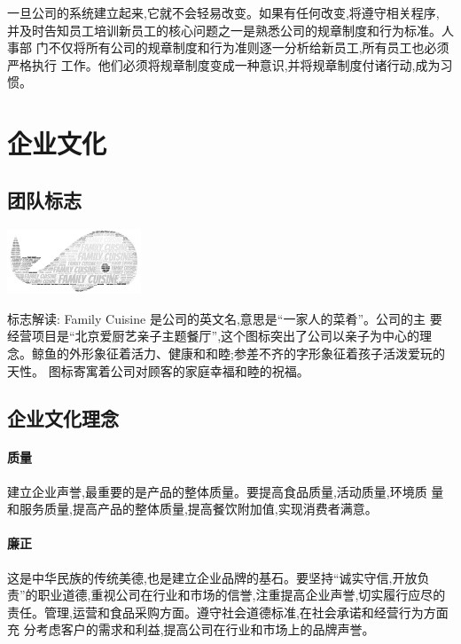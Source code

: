 一旦公司的系统建立起来,它就不会轻易改变。如果有任何改变,将遵守相关程序,
并及时告知员工培训新员工的核心问题之一是熟悉公司的规章制度和行为标准。人事部
门不仅将所有公司的规章制度和行为准则逐一分析给新员工,所有员工也必须严格执行
工作。他们必须将规章制度变成一种意识,并将规章制度付诸行动,成为习惯。

\section{企业文化}
\subsection{团队标志}

\begin{center}
        \label{figure:company-logo}
        \includegraphics[width=0.3\textwidth]{../images/company-logo}
\end{center}

标志解读: Family Cuisine 是公司的英文名,意思是“一家人的菜肴”。公司的主
要经营项目是“北京爱厨艺亲子主题餐厅”,这个图标突出了公司以亲子为中心的理
念。鲸鱼的外形象征着活力、健康和和睦;参差不齐的字形象征着孩子活泼爱玩的天性。
图标寄寓着公司对顾客的家庭幸福和睦的祝福。

\subsection{企业文化理念}
\paragraph{质量}
建立企业声誉,最重要的是产品的整体质量。要提高食品质量,活动质量,环境质
量和服务质量,提高产品的整体质量,提高餐饮附加值,实现消费者满意。

\paragraph{廉正}
这是中华民族的传统美德,也是建立企业品牌的基石。要坚持“诚实守信,开放负
责”的职业道德,重视公司在行业和市场的信誉,注重提高企业声誉,切实履行应尽的
责任。管理,运营和食品采购方面。遵守社会道德标准,在社会承诺和经营行为方面充
分考虑客户的需求和利益,提高公司在行业和市场上的品牌声誉。

